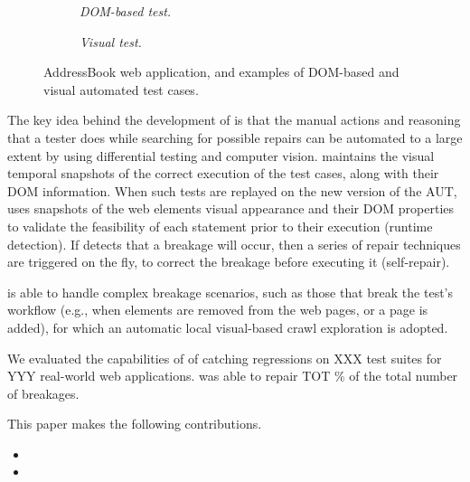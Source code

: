 \begin{figure}[t]
\begin{subfigure}{.25\linewidth}
\caption{\emph{DOM-based test.}}
\label{fig:ab-back-c} 
\end{subfigure}
\quad
\begin{subfigure}{.20\linewidth}
\centering
{}
\caption{\emph{Visual test.}}
\label{fig:ab-back-d} 
\end{subfigure}
\caption{AddressBook web application, and examples of DOM-based and visual automated test cases. }
\label{fig:ab-back}
\end{figure}


The key idea behind the development of \tool is that the manual actions and reasoning that a tester does while searching for possible repairs can be automated to a large extent by using differential testing and computer vision. 
\tool maintains the visual temporal snapshots of the correct execution of the test cases, along with their DOM information. When such tests are replayed on the new version of the AUT, \tool uses snapshots of the web elements visual appearance and their DOM properties to validate the feasibility of each statement prior to their execution (runtime detection). If \tool detects that a breakage will occur, then a series of repair techniques are triggered on the fly, to correct the breakage before executing it (self-repair).

\tool is able to handle complex breakage scenarios, such as those that break the test's workflow (e.g., when elements are removed from the web pages, or a page is added), for which an automatic local visual-based crawl exploration is adopted.

We evaluated the capabilities of \tool of catching regressions on XXX test suites for YYY real-world web applications. \tool was able to repair TOT \% of the total number of breakages. 

This paper makes the following contributions.
\begin{itemize}
\item 
\item
\end{itemize}








